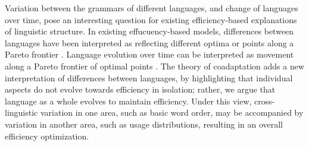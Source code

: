 \documentclass[11pt,a4paper]{article}
\begin{document}
Variation between the grammars of different languages, and change of languages over time, pose an interesting question for existing efficiency-based explanations of linguistic structure.
In existing effucuency-based models, differences between languages have been interpreted as reflecting different optima or points along a Pareto frontier \citep{zaslavsky2018efficient, hahn2020universals}.
Language evolution over time can be interpreted as movement along a Pareto frontier of optimal points \citep{zaslavsky2019evolution}.
The theory of coadaptation adds a new interpretation of differences between languages, by highlighting that individual aspects do not evolve towards efficiency in isolation; rather, we argue that language as a whole evolves to maintain efficiency.
Under this view, cross-linguistic variation in one area, such as basic word order, may be accompanied by variation in another area, such as usage distributions, resulting in an overall efficiency optimization.



\end{document}
